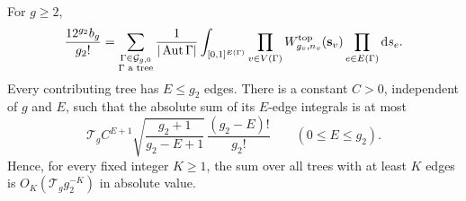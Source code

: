 \begin{prp}\label{prp:s06:tree-tail}
For $g\geq2$,
\begin{equation}\label{eq:s06:tree-expansion}
 \frac{12^{g_2}b_g}{g_2!}
 =\sum_{\substack{\Gamma\in\mathcal G_{g,0}\\\Gamma\text{ a tree}}}
  \frac1{|\operatorname{Aut}\Gamma|}
  \int_{[0,1]^{E(\Gamma)}}
       \prod_{v\in V(\Gamma)}W^{\rm top}_{g_v,n_v}(\mathbf s_v)
       \prod_{e\in E(\Gamma)}\mathrm{d} s_e.
\end{equation}
Every contributing tree has $E\leq g_2$ edges. There is a constant
$C>0$, independent of $g$ and $E$, such that the absolute sum of
its $E$-edge integrals is at most
\begin{equation}\label{eq:s06:edge-mass}
 \mathcal T_g C^{E+1}
 \sqrt{\frac{g_2+1}{g_2-E+1}}\,
                  \frac{(g_2-E)!}{g_2!}
 \qquad(0\leq E\leq g_2).
\end{equation}
Hence, for every fixed integer $K\geq1$, the sum over all trees
with at least $K$ edges is $O_K(\mathcal T_g g_2^{-K})$ in
absolute value.
\end{prp}
